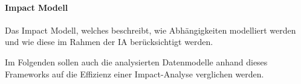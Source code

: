 \paragraph{Impact Modell}
    Das Impact Modell, welches beschreibt, wie Abhängigkeiten modelliert werden und wie diese im Rahmen der \ac{IA} berücksichtigt werden.

\bigskip
\noindent
Im Folgenden sollen auch die analysierten Datenmodelle anhand dieses Frameworks auf die Effizienz einer Impact-Analyse verglichen werden. 





